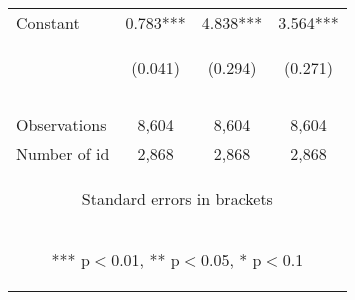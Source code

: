 \begin{center}
\begin{tabular}{lccc}
Constant & 0.783*** & 4.838*** & 3.564*** \\
 & \begin{footnotesize}(0.041)\end{footnotesize} & \begin{footnotesize}(0.294)\end{footnotesize} & \begin{footnotesize}(0.271)\end{footnotesize} \\
 & \begin{footnotesize}[0.000]\end{footnotesize} & \begin{footnotesize}[0.000]\end{footnotesize} & \begin{footnotesize}[0.000]\end{footnotesize} \\
\vspace{4pt} & \begin{footnotesize}\end{footnotesize} & \begin{footnotesize}\end{footnotesize} & \begin{footnotesize}\end{footnotesize} \\
Observations & 8,604 & 8,604 & 8,604 \\
 Number of id & 2,868 & 2,868 & 2,868 \\ \hline
\multicolumn{4}{c}{\begin{footnotesize} Standard errors in brackets\end{footnotesize}} \\
\multicolumn{4}{c}{\begin{footnotesize} *** p$<$0.01, ** p$<$0.05, * p$<$0.1\end{footnotesize}} \\
\end{tabular}
\end{center}
